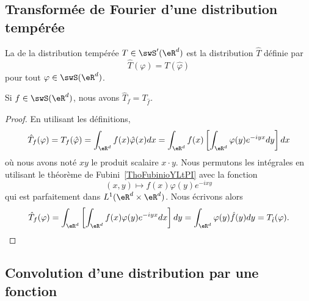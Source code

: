 \subsection{Transformée de Fourier d'une distribution tempérée}

\begin{definition}
    La  de la distribution tempérée \( T\in\swS'(\eR^d)\) est la distribution \( \hat T\) définie par
    \begin{equation}
        \hat T(\varphi)=T(\hat \varphi)
    \end{equation}
    pour tout \( \varphi\in\swS(\eR^d)\).
\end{definition}

\begin{lemma}
    Si \( f\in \swS(\eR^d)\), nous avons \( \hat T_f=T_{\hat f}\).
\end{lemma}

\begin{proof}
    En utilisant les définitions,
    \begin{equation}
        \hat T_f(\varphi)=T_f(\hat \varphi)=\int_{\eR^d}f(x)\hat \varphi(x)dx=\int_{\eR^d}f(x)\left[ \int_{\eR^d}\varphi(y) e^{-iyx}dy \right]dx
    \end{equation}
    où nous avons noté \( xy\) le produit scalaire \( x\cdot y\). Nous permutons les intégrales en utilisant le théorème de Fubini~\ref{ThoFubinioYLtPI} avec la fonction
    \begin{equation}
        (x,y)\mapsto f(x)\varphi(y) e^{-ixy}
    \end{equation}
    qui est parfaitement dans \( L^1(\eR^d\times \eR^d)\). Nous écrivons alors
    \begin{equation}
        \hat T_f(\varphi)=\int_{\eR^d}\left[ \int_{\eR^d}f(x)\varphi(y) e^{-iyx}dx \right]dy=\int_{\eR^d}\varphi(y)\hat f(y)dy=T_{\hat t}(\varphi).
    \end{equation}
\end{proof}

\subsection{Convolution d'une distribution par une fonction}

